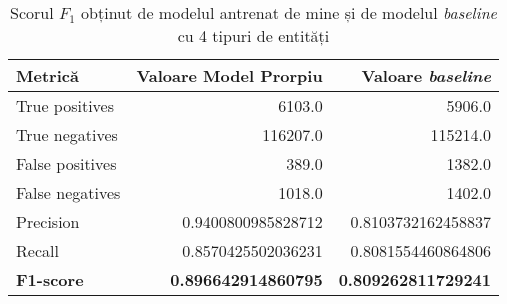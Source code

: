 \begin{center}
\begin{table}[htb]
  \caption{Scorul $F_1$ obținut de modelul antrenat de mine și de modelul \textit{baseline} cu 4 tipuri de entități}
  \begin{tabular}{|l|r|r|}
  \hline
   Metrică & Valoare Model Prorpiu & Valoare \textit{baseline}\\
   \hline
  True positives & 6103.0 & 5906.0 \\
  True negatives & 116207.0 & 115214.0\\
  False positives & 389.0 & 1382.0 \\
  False negatives & 1018.0 & 1402.0\\
    \hline
  Precision &  0.9400800985828712 & 0.8103732162458837 \\
  Recall &  0.8570425502036231 & 0.8081554460864806 \\
  \hline
  \textbf{F1-score} & \textbf{0.896642914860795} & \textbf{0.809262811729241}\\
   \hline
   
  \end{tabular}
  \label{table:f1-score-5-class}
\end{table}
\end{center}

